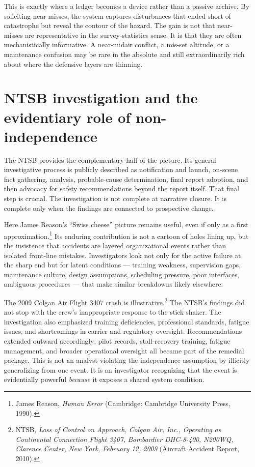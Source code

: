 \documentclass[11pt]{article}
\begin{document}
This is exactly where a ledger becomes a \continuation{} device rather than a passive archive. By soliciting near-misses, the system captures disturbances that ended short of catastrophe but reveal the contour of the hazard. The gain is not that near-misses are representative in the survey-statistics sense. It is that they are often mechanistically informative. A near-midair conflict, a mis-set altitude, or a maintenance confusion may be rare in the absolute and still extraordinarily rich about where the defensive layers are thinning.

\section{NTSB investigation and the evidentiary role of non-independence}
The NTSB provides the complementary half of the picture. Its general investigative process is publicly described as notification and launch, on-scene fact gathering, analysis, probable-cause determination, final report adoption, and then advocacy for safety recommendations beyond the report itself. That final step is crucial. The investigation is not complete at narrative closure. It is complete only when the findings are connected to prospective change.

Here James Reason's ``Swiss cheese'' picture remains useful, even if only as a first approximation.\footnote{James Reason, \emph{Human Error} (Cambridge: Cambridge University Press, 1990).} Its enduring contribution is not a cartoon of holes lining up, but the insistence that accidents are layered organizational events rather than isolated front-line mistakes. Investigators look not only for the active failure at the sharp end but for latent conditions --- training weakness, supervision gaps, maintenance culture, design assumptions, scheduling pressure, poor interfaces, ambiguous procedures --- that make similar breakdowns likely elsewhere.

The 2009 Colgan Air Flight 3407 crash is illustrative.\footnote{NTSB, \textit{Loss of Control on Approach, Colgan Air, Inc., Operating as Continental Connection Flight 3407, Bombardier DHC-8-400, N200WQ, Clarence Center, New York, February 12, 2009} (Aircraft Accident Report, 2010).} The NTSB's findings did not stop with the crew's inappropriate response to the stick shaker. The investigation also emphasized training deficiencies, professional standards, fatigue issues, and shortcomings in carrier and regulatory oversight. Recommendations extended outward accordingly: pilot records, stall-recovery training, fatigue management, and broader operational oversight all became part of the remedial package. This is not an analyst violating the independence assumption by illicitly generalizing from one event. It is an investigator recognizing that the event is evidentially powerful \emph{because} it exposes a shared system condition.
\end{document}
